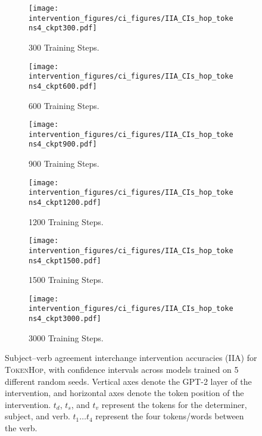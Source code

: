 \documentclass[11pt]{article}
\begin{document}
\begin{figure*}
    \centering
     \begin{subfigure}{0.49\textwidth}
         \centering
         \texttt{[image: intervention\_figures/ci\_figures/IIA\_CIs\_hop\_tokens4\_ckpt300.pdf]}
         \caption{300 Training Steps.}
     \end{subfigure}
     \begin{subfigure}{0.49\textwidth}
         \centering
         \texttt{[image: intervention\_figures/ci\_figures/IIA\_CIs\_hop\_tokens4\_ckpt600.pdf]}
         \caption{600 Training Steps.}
     \end{subfigure}
     \begin{subfigure}{0.49\textwidth}
         \centering
         \texttt{[image: intervention\_figures/ci\_figures/IIA\_CIs\_hop\_tokens4\_ckpt900.pdf]}
         \caption{900 Training Steps.}
     \end{subfigure}
     \begin{subfigure}{0.49\textwidth}
         \centering
         \texttt{[image: intervention\_figures/ci\_figures/IIA\_CIs\_hop\_tokens4\_ckpt1200.pdf]}
         \caption{1200 Training Steps.}
     \end{subfigure}
     \begin{subfigure}{0.49\textwidth}
         \centering
         \texttt{[image: intervention\_figures/ci\_figures/IIA\_CIs\_hop\_tokens4\_ckpt1500.pdf]}
         \caption{1500 Training Steps.}
     \end{subfigure}
     \begin{subfigure}{0.49\textwidth}
         \centering
         \texttt{[image: intervention\_figures/ci\_figures/IIA\_CIs\_hop\_tokens4\_ckpt3000.pdf]}
         \caption{3000 Training Steps.}
     \end{subfigure}
    \caption{Subject--verb agreement interchange intervention accuracies (IIA) for
    \textsc{TokenHop}, with confidence intervals across models trained on 5 different random seeds. Vertical axes denote the GPT-2 layer of the intervention, and horizontal axes denote the token position of the intervention. $t_d$, $t_s$, and $t_v$ represent the tokens for the determiner, subject, and verb. $t_1 \dots t_4$ represent the four tokens/words between the verb.}
    \label{fig:iia_ci_hop_tokens4}
\end{figure*}
\end{document}
